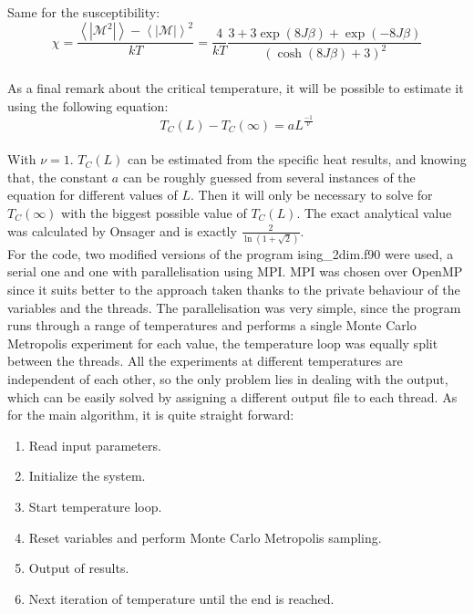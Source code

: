 \documentclass[11pt,a4paper,oneside]{article}
\begin{document}
		Same for the susceptibility:\\
		
		\begin{equation*}\chi=\frac{\left<\left|\mathcal{M}^2\right|\right>-\left<\left|\mathcal{M}\right|\right>^2}{kT}=\frac{4}{kT}\frac{3+3\exp{\left(8J\beta\right)}+\exp{\left(-8J\beta\right)}}{\left(\cosh{\left(8J\beta\right)}+3\right)^2}\end{equation*}\\
		
		As a final remark about the critical temperature, it will be possible to estimate it using the following equation:\\
		
		\begin{equation*}T_C\left(L\right)-T_C\left(\infty\right)=aL^{\frac{-1}{\nu}}\end{equation*}\\
		
		With $\nu=1$. $T_C\left(L\right)$ can be estimated from the specific heat results, and knowing that, the constant $a$ can be roughly guessed from several instances of the equation for different values of $L$. Then it will only be necessary to solve for $T_C\left(\infty\right)$ with the biggest possible value of $T_C\left(L\right)$. The exact analytical value was calculated by Onsager and is exactly $\frac{2}{\ln{\left(1+\sqrt{2}\right)}}$.\\
		
		For the code, two modified versions of the program ising\_2dim.f90 were used, a serial one and one with parallelisation using MPI. MPI was chosen over OpenMP since it suits better to the approach taken thanks to the private behaviour of the variables and the threads. The parallelisation was very simple, since the program runs through a range of temperatures and performs a single Monte Carlo Metropolis experiment for each value, the temperature loop was equally split between the threads. All the experiments at different temperatures are independent of each other, so the only problem lies in dealing with the output, which can be easily solved by assigning a different output file to each thread. As for the main algorithm, it is quite straight forward:\\
		
		\begin{enumerate}
			\item Read input parameters.
			\item Initialize the system.
			\item Start temperature loop.
			\item Reset variables and perform Monte Carlo Metropolis sampling.
			\item Output of results.
			\item Next iteration of temperature until the end is reached.\\
		\end{enumerate}
		
\end{document}
